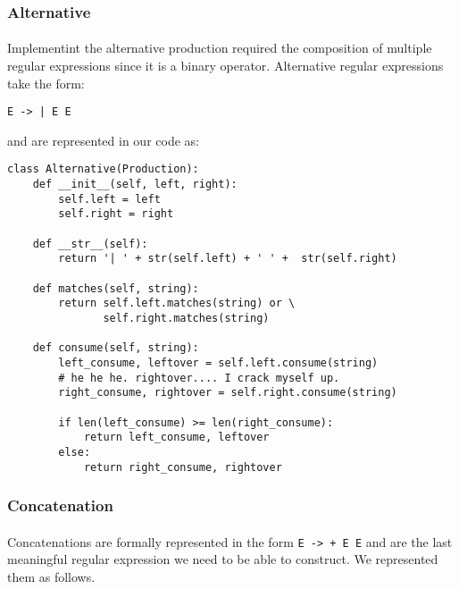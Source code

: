 \documentclass{article}
\begin{document}
\subsubsection{Alternative}
\paragraph{} Implementint the alternative production required the composition 
of multiple regular expressions since it is a binary operator. Alternative
regular expressions take the form: 

\begin{verbatim}
E -> | E E
\end{verbatim}

and are represented in our code as:

\begin{verbatim}
class Alternative(Production):
    def __init__(self, left, right):
        self.left = left
        self.right = right

    def __str__(self):
        return '| ' + str(self.left) + ' ' +  str(self.right)

    def matches(self, string):
        return self.left.matches(string) or \
               self.right.matches(string)

    def consume(self, string):
        left_consume, leftover = self.left.consume(string)
        # he he he. rightover.... I crack myself up.
        right_consume, rightover = self.right.consume(string)

        if len(left_consume) >= len(right_consume):
            return left_consume, leftover
        else:
            return right_consume, rightover

\end{verbatim}

\subsubsection{Concatenation}
\label{sec:algos:regex:concat}
\paragraph{} Concatenations are formally represented in the form \verb|E -> + E E| and are the last meaningful regular expression we need to be able to construct. We represented them as follows.
\end{document}
